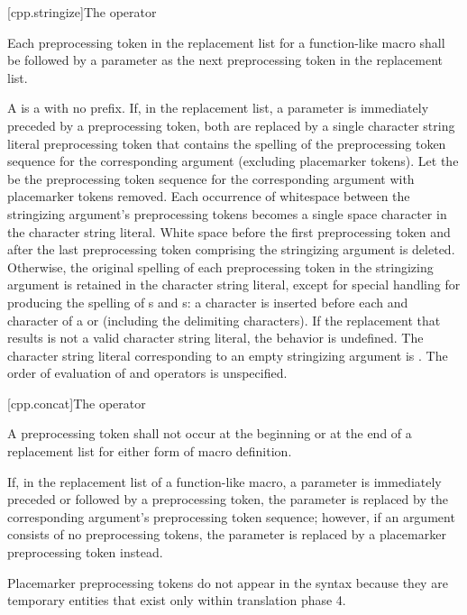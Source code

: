 [cpp.stringize]{The \tcode{\#} operator}%
%

\pnum
Each
\tcode{\#}
preprocessing token in the replacement list for a function-like
macro shall be followed by a parameter as the next preprocessing
token in the replacement list.

\pnum
A  is a  with no prefix.
If, in the replacement list, a parameter is immediately
preceded by a
\tcode{\#}
preprocessing token,
both are replaced by a single character string literal preprocessing token that
contains the spelling of the preprocessing token sequence for the
corresponding argument (excluding placemarker tokens).
Let the  be the preprocessing token sequence
for the corresponding argument with placemarker tokens removed.
Each occurrence of whitespace between the stringizing argument's preprocessing
tokens becomes a single space character in the character string literal.
White space before the first preprocessing token and after the last
preprocessing token comprising the stringizing argument is deleted.
Otherwise, the original spelling of each preprocessing token in the
stringizing argument is retained in the character string literal,
except for special handling for producing the spelling of
s and s:
a
\tcode{\textbackslash}
character is inserted before each
and
\tcode{\textbackslash}
character of a  or 
(including the delimiting
characters).
If the replacement that results is not a valid character string literal,
the behavior is undefined. The character string literal corresponding to
an empty stringizing argument is .
The order of evaluation of
\tcode{\#}
and
\tcode{\#\#}
operators is unspecified.

[cpp.concat]{The \tcode{\#\#} operator}%
%

\pnum
A
\tcode{\#\#}
preprocessing token shall not occur at the beginning or
at the end of a replacement list for either form
of macro definition.

\pnum
If, in the replacement list of a function-like macro, a parameter is
immediately preceded or followed by a
\tcode{\#\#}
preprocessing token, the parameter is replaced by the
corresponding argument's preprocessing token sequence; however, if an argument consists of no preprocessing tokens, the parameter is
replaced by a placemarker preprocessing token instead.
\begin{footnote}
Placemarker preprocessing tokens do not appear in the syntax
because they are temporary entities that exist only within translation phase 4.
\end{footnote}

